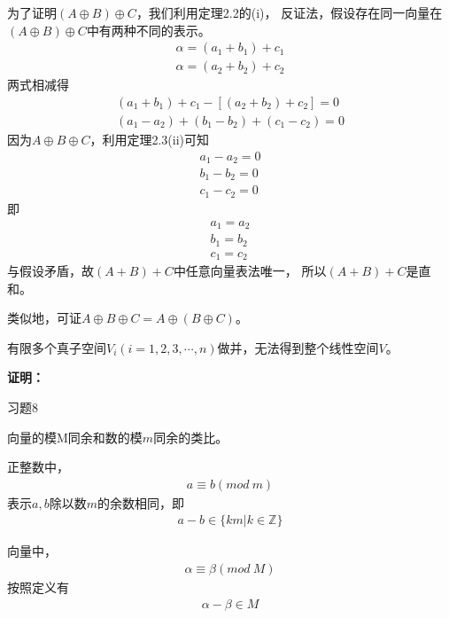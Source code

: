 \documentclass{article}
\begin{document}
\begin{itemize}
        为了证明$(A \oplus B) \oplus C$，我们利用定理2.2的(i)，
        反证法，假设存在同一向量在$(A \oplus B) \oplus C$中有两种不同的表示。
        \begin{align*}
          \alpha = (a_1 + b_1) + c_1 \\
          \alpha = (a_2 + b_2) + c_2
        \end{align*}
        两式相减得
        \begin{align*}
          (a_1 + b_1) + c_1 - [(a_2 + b_2) + c_2] = 0 \\
          (a_1 - a_2) + (b_1 - b_2) + (c_1 - c_2) = 0
        \end{align*}
        因为$A \oplus B \oplus C$，利用定理2.3(ii)可知
        \begin{align*}
          a_1 - a_2 = 0 \\
          b_1 - b_2 = 0 \\
          c_1 - c_2 = 0
        \end{align*}
        即
        \begin{align*}
          a_1 = a_2 \\
          b_1 = b_2 \\
          c_1 = c_2
        \end{align*}
        与假设矛盾，故$(A + B) + C$中任意向量表法唯一，
        所以$(A + B) + C$是直和。
\end{itemize}
类似地，可证$A \oplus B \oplus C = A \oplus (B \oplus C)$。

\begin{zremark}
  有限多个真子空间$V_i (i = 1, 2, 3, \cdots, n)$做并，无法得到整个线性空间$V$。
\end{zremark}

\textbf{证明：}

习题8

\begin{zremark}
  向量的模M同余和数的模$m$同余的类比。
\end{zremark}

正整数中，
\begin{align*}
  a \equiv b (mod \ m)
\end{align*}
表示$a,b$除以数$m$的余数相同，即
\begin{align*}
  a - b \in \{km | k \in \mathbb{Z}\}
\end{align*}

向量中，
\begin{align*}
  \alpha \equiv \beta (mod \ M)
\end{align*}
按照定义有
\begin{align*}
  \alpha - \beta \in M
\end{align*}
\end{document}
